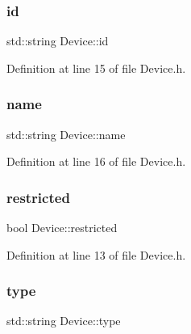 \mbox{\label{class_device_aa07acb3cbc8c6e2cfcfbf1be7f79b4d1}} 
\subsubsection{\texorpdfstring{id}{id}}
{\footnotesize\ttfamily std\+::string Device\+::id\hspace{0.3cm}{\ttfamily [private]}}



Definition at line 15 of file Device.\+h.

\mbox{\label{class_device_ae779f5ee618677629b71287f3f77f8e8}} 
\subsubsection{\texorpdfstring{name}{name}}
{\footnotesize\ttfamily std\+::string Device\+::name\hspace{0.3cm}{\ttfamily [private]}}



Definition at line 16 of file Device.\+h.

\mbox{\label{class_device_a86832f8fbd54579dcce93c8470f27377}} 
\subsubsection{\texorpdfstring{restricted}{restricted}}
{\footnotesize\ttfamily bool Device\+::restricted\hspace{0.3cm}{\ttfamily [private]}}



Definition at line 13 of file Device.\+h.

\mbox{\label{class_device_a06b952ae4a767b7f8fc040915f34e148}} 
\subsubsection{\texorpdfstring{type}{type}}
{\footnotesize\ttfamily std\+::string Device\+::type\hspace{0.3cm}{\ttfamily [private]}}



